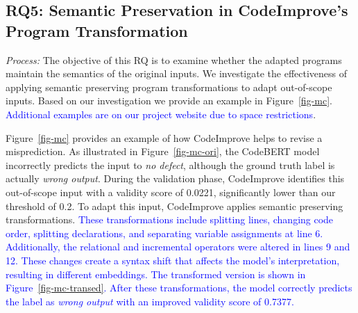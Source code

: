 \subsection{RQ5: Semantic Preservation in CodeImprove's Program Transformation}
%
\vspace{-1em}
\textit{Process: } The objective of this RQ is to examine whether the adapted programs maintain the semantics of the original inputs. We investigate the effectiveness of applying semantic preserving program transformations to adapt out-of-scope inputs. Based on our investigation we provide an example in Figure~\ref{fig-mc}. \textcolor{blue}{Additional examples are on our project website due to space restrictions\cite{CodeImprove}}.


Figure~\ref{fig-mc} provides an example of how CodeImprove helps to revise a misprediction. As illustrated in Figure~\ref{fig-mc-ori}, the CodeBERT model incorrectly predicts the input to \textit{no defect}, although the ground truth label is actually \textit{wrong output}. During the validation phase, CodeImprove identifies this out-of-scope input with a validity score of 0.0221, significantly lower than our threshold of 0.2. To adapt this input, CodeImprove applies semantic preserving transformations. \textcolor{blue}{These transformations include splitting lines, changing code order,  splitting declarations, and separating variable assignments at line 6. Additionally, the relational and incremental operators were altered in lines 9 and 12. These changes create a syntax shift that affects the model's interpretation, resulting in different embeddings. The transformed version is shown in Figure~\ref{fig-mc-transed}. After these transformations, the model correctly predicts the label as \textit{wrong output} with an improved validity score of 0.7377. }

